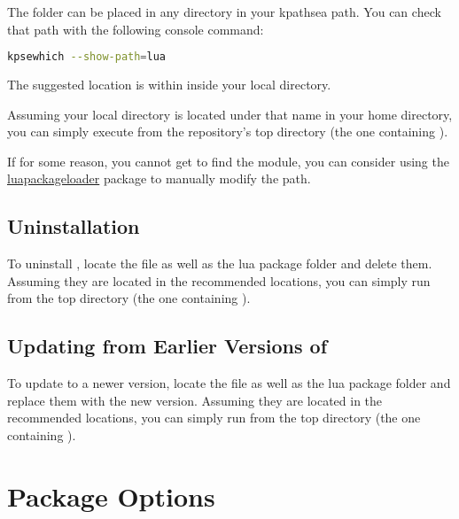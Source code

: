 \documentclass{ltxdockit}
\begin{document}
The  folder can be placed in any directory in your
kpathsea path.
You can check that path with the following console command:

\begin{lstlisting}[language=bash]
  kpsewhich --show-path=lua
\end{lstlisting}

The suggested location is within  inside your
local  directory.

Assuming your local  directory is located under that name in your
home directory, you can simply execute  from the repository's
top directory (the one containing ).

If for some reason, you cannot get  to find the module, you can
consider using the
\href{https://www.ctan.org/pkg/luapackageloader}{luapackageloader} package to
manually modify the path.

\subsection{Uninstallation}

To uninstall \transconv{}, locate the  file as well as the
 lua package folder and delete them. Assuming they are located
in the recommended locations, you can simply run  from
the top directory (the one containing ).

\subsection{Updating from Earlier Versions of \transconv{}}

To update \transconv{} to a newer version, locate the 
file as well as the  lua package folder and replace them with
the new version. Assuming they are located in the recommended locations, you can
simply run  from the top directory (the one containing
).

\section{Package Options}
\end{document}

